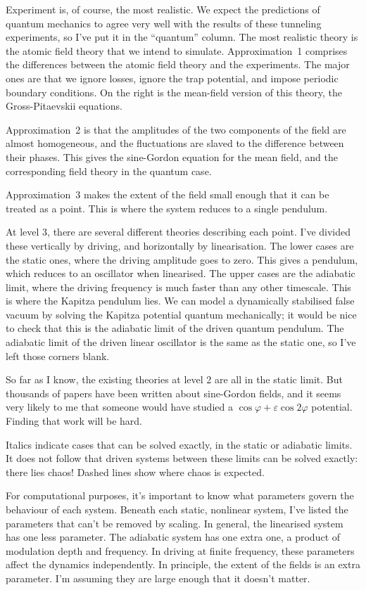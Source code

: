 Experiment is, of course, the most realistic.  We expect the predictions of quantum mechanics to agree very well with the results of these tunneling experiments, so I've put it in the “quantum” column.  The most realistic theory is the atomic field theory that we intend to simulate.  Approximation~1 comprises the differences between the atomic field theory and the experiments.  The major ones are that we ignore losses, ignore the trap potential, and impose periodic boundary conditions.  On the right is the mean-field version of this theory, the Gross-Pitaevskii equations.

Approximation~2 is that the amplitudes of the two components of the field are almost homogeneous, and the fluctuations are slaved to the difference between their phases.  This gives the sine-Gordon equation for the mean field, and the corresponding field theory in the quantum case.

Approximation~3 makes the extent of the field small enough that it can be treated as a point.  This is where the system reduces to a single pendulum.

At level 3, there are several different theories describing each point.  I've divided these vertically by driving, and horizontally by linearisation.  The lower cases are the static ones, where the driving amplitude goes to zero.  This gives a pendulum, which reduces to an oscillator when linearised.  The upper cases are the adiabatic limit, where the driving frequency is much faster than any other timescale.  This is where the Kapitza pendulum lies.  We can model a dynamically stabilised false vacuum by solving the Kapitza potential quantum mechanically; it would be nice to check that this is the adiabatic limit of the driven quantum pendulum.  The adiabatic limit of the driven linear oscillator is the same as the static one, so I've left those corners blank.

So far as I know, the existing theories at level 2 are all in the static limit.  But thousands of papers have been written about sine-Gordon fields, and it seems very likely to me that someone would have studied a $\cos φ + ε\cos 2φ$ potential.  Finding that work will be hard.

Italics indicate cases that can be solved exactly, in the static or adiabatic limits.  It does not follow that driven systems between these limits can be solved exactly: there lies chaos!  Dashed lines show where chaos is expected.

For computational purposes, it's important to know what parameters govern the behaviour of each system.  Beneath each static, nonlinear system, I've listed the parameters that can't be removed by scaling.  In general, the linearised system has one less parameter.  The adiabatic system has one extra one, a product of modulation depth and frequency.  In driving at finite frequency, these parameters affect the dynamics independently.  In principle, the extent of the fields is an extra parameter.  I'm assuming they are large enough that it doesn't matter.

